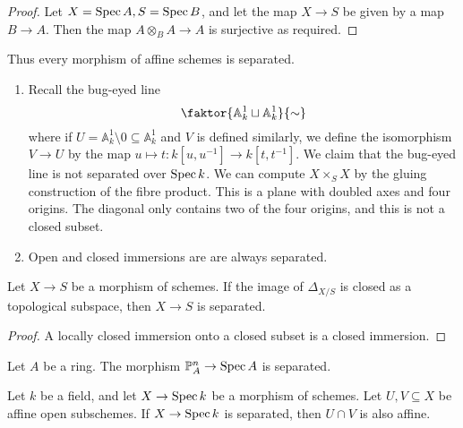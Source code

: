 \begin{proof}
    Let \( X = \operatorname{Spec} A, S = \operatorname{Spec} B \), and let the map \( X \to S \) be given by a map \( B \to A \).
    Then the map \( A \otimes_B A \to A \) is surjective as required.
\end{proof}
Thus every morphism of affine schemes is separated.
\begin{example}
    \begin{enumerate}
        \item Recall the bug-eyed line
        \[ \faktor{\mathbb A^1_k \sqcup \mathbb A^1_k} {\sim} \]
        where if \( U = \mathbb A^1_k \setminus \qty{0} \subseteq \mathbb A^1_k \) and \( V \) is defined similarly, we define the isomorphism \( V \to U \) by the map \( u \mapsto t : k[u,u^{-1}] \to k[t,t^{-1}] \).
        We claim that the bug-eyed line is not separated over \( \operatorname{Spec} k \).
        We can compute \( X \times_S X \) by the gluing construction of the fibre product.
        This is a plane with doubled axes and four origins.
        The diagonal only contains two of the four origins, and this is not a closed subset.
        \item Open and closed immersions are are always separated.
    \end{enumerate}
\end{example}
\begin{corollary}
    Let \( X \to S \) be a morphism of schemes.
    If the image of \( \Delta_{X/S} \) is closed as a topological subspace, then \( X \to S \) is separated.
\end{corollary}
\begin{proof}
    A locally closed immersion onto a closed subset is a closed immersion.
\end{proof}
\begin{proposition}
    Let \( A \) be a ring.
    The morphism \( \mathbb P^n_A \to \operatorname{Spec} A \) is separated.
\end{proposition}
\begin{proposition}
    Let \( k \) be a field, and let \( X \to \operatorname{Spec} k \) be a morphism of schemes.
    Let \( U, V \subseteq X \) be affine open subschemes.
    If \( X \to \operatorname{Spec} k \) is separated, then \( U \cap V \) is also affine.
\end{proposition}

